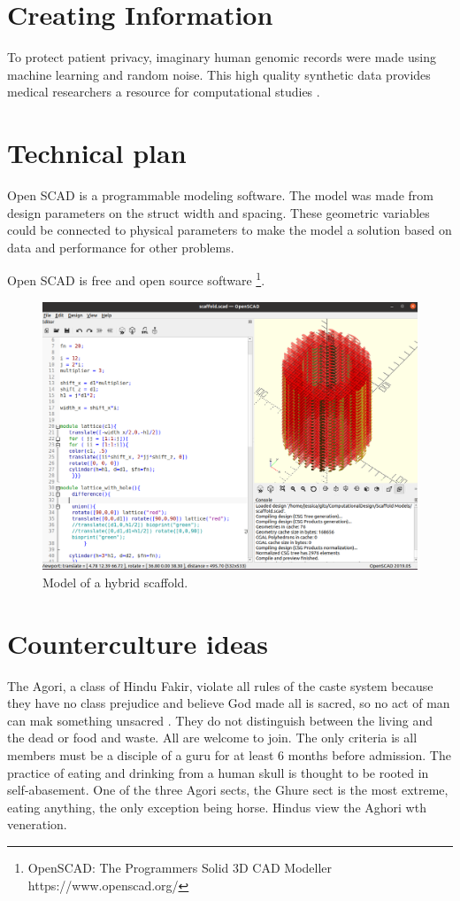 \documentclass[a4paper,11pt]{article}
\begin{document}
\section{Creating Information}


To protect patient privacy, imaginary human genomic records were made using machine learning and random noise. This high quality synthetic data provides medical researchers a resource for computational studies \cite{yelmen2021creating}.

\section{Technical plan}

Open SCAD is a programmable modeling software. The model was made from design parameters on the struct width and spacing. These geometric variables could be connected to physical parameters to make the model a solution based on data and performance for other problems. 

Open SCAD is free and open source software \footnote{
OpenSCAD: The Programmers Solid 3D CAD Modeller https://www.openscad.org/}.

\begin{figure}
  \includegraphics[width=\linewidth]{day05.png}
  \caption{Model of a hybrid scaffold.}
  \label{fig:boat1}
\end{figure}

\section{Counterculture ideas}

The Agori, a class of Hindu Fakir, violate all rules of the caste system because they have no class prejudice and believe God made all is sacred, so no act of man can mak something unsacred \cite{balfour1897life}. They do not distinguish between the living and the dead or food and waste. All are welcome to join. The only criteria is all members must be a disciple of a guru for at least 6 months before admission. The practice of eating and drinking from a human skull is thought to be rooted in self-abasement. One of the three Agori sects, the Ghure sect is the most extreme, eating anything, the only exception being horse. Hindus view the Aghori wth veneration. 





\newpage
\end{document}
